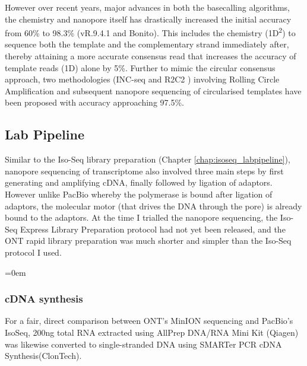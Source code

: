 
However over recent years, major advances in both the basecalling algorithms, the chemistry and nanopore itself has drastically increased the initial accuracy from 60\% \cite{Jain2015} to 98.3\% (vR.9.4.1 and Bonito). This includes the chemistry (1D\textsuperscript{2}) to sequence both the template and the complementary strand immediately after, thereby attaining a more accurate consensus read that increases the accuracy of template reads (1D) alone by 5\%\cite{Rang2018}. Further to mimic the circular consensus approach, two methodologies (INC-seq \cite{Li2016c} and R2C2 \cite{Volden2018}) involving Rolling Circle Amplification and subsequent nanopore sequencing of circularised templates have been proposed with accuracy approaching 97.5\%. 

\subsection{Lab Pipeline}
\label{chap:ont_labpipeline}
Similar to the Iso-Seq library preparation (Chapter \ref{chap:isoseq_labpipeline}), nanopore sequencing of transcriptome also involved three main steps by first generating and amplifying cDNA, finally followed by ligation of adaptors. However unlike PacBio whereby the polymerase is bound after ligation of adaptors, the molecular motor (that drives the DNA through the pore) is already bound to the adaptors. At the time I trialled the nanopore sequencing, the Iso-Seq Express Library Preparation protocol had not yet been released, and the ONT rapid library preparation was much shorter and simpler than the Iso-Seq protocol I used.    

\begingroup
\parindent=0em
\localtableofcontents 
\endgroup

\subsubsection{cDNA synthesis}
For a fair, direct comparison between ONT's MinION sequencing and PacBio's IsoSeq, 200ng total RNA extracted using AllPrep DNA/RNA Mini Kit (Qiagen) was likewise converted to single-stranded DNA using SMARTer PCR cDNA Synthesis(ClonTech).

